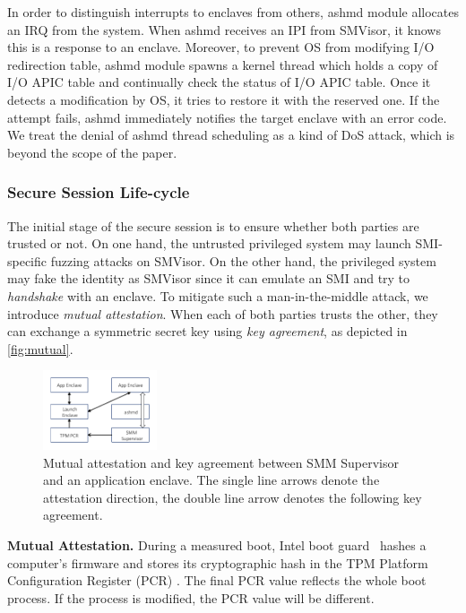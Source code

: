 In order to distinguish interrupts to enclaves from others, ashmd module allocates an IRQ from the system. When ashmd receives an IPI from  SMVisor, it knows this is a response to an enclave.
Moreover, to prevent OS from modifying I/O redirection table, ashmd module spawns a kernel thread which holds a copy of  I/O APIC table and continually check the status of I/O APIC  table. Once it detects a modification by OS, it tries to restore it with the reserved one. If the attempt fails, ashmd  immediately notifies the target enclave with an error code.  We treat the denial of ashmd thread scheduling as a kind of DoS attack, which is beyond the scope of the paper.

\subsubsection{Secure Session Life-cycle}
The initial stage of the secure session is to ensure whether both parties are trusted or not. On one hand, the untrusted privileged system may launch SMI-specific fuzzing attacks on  SMVisor. On the other hand, the privileged system may fake the identity as  SMVisor since it can emulate an SMI and try to \textit{handshake} with an enclave. To mitigate such a man-in-the-middle attack, we introduce \textit{mutual attestation}. When each of both parties trusts the other, they can exchange a symmetric secret key using \textit{key agreement}, as depicted in \autoref{fig:mutual}. %

\begin{figure}[t]
\centering
\includegraphics[width=0.3\textwidth]{figures/mutual.pdf}%
\caption{Mutual attestation and key agreement between SMM Supervisor and an application enclave. The single line arrows denote the attestation direction, the double line arrow denotes the following key agreement.}
\label{fig:mutual}
\end{figure}

\textbf{Mutual Attestation.}
During a measured boot, Intel boot guard~\cite{ruan_platform_2014}  hashes a computer's firmware and stores its cryptographic hash in the TPM Platform Configuration Register (PCR) \cite{tcg_trusted_2014}. The final PCR value reflects the whole boot process. If the process is modified, the PCR value will be different.


